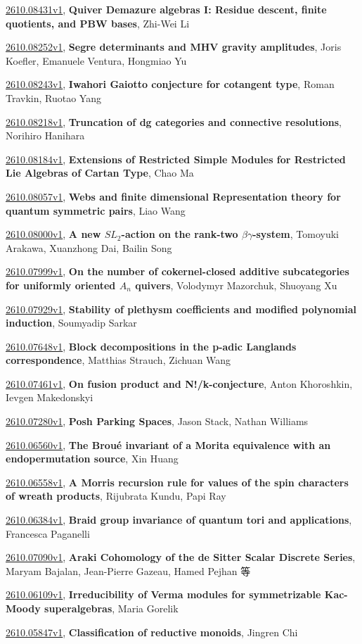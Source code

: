 \documentclass[9pt, a4paper]{article}
\theoremstyle{plain}
\theoremstyle{definition}
\theoremstyle{remark}
\newcommand{\arxiv}[3]{\href{https://arxiv.org/abs/#1}{#1}, \textbf{\textcolor{arxivblue}{#2}}, #3}
\begin{document}
\arxiv{2610.08431v1}{Quiver Demazure algebras I: Residue descent, finite quotients, and PBW bases}{Zhi-Wei Li}

\arxiv{2610.08252v1}{Segre determinants and MHV gravity amplitudes}{Joris Koefler, Emanuele Ventura, Hongmiao Yu}

\arxiv{2610.08243v1}{Iwahori Gaiotto conjecture for cotangent type}{Roman Travkin, Ruotao Yang}

\arxiv{2610.08218v1}{Truncation of dg categories and connective resolutions}{Norihiro Hanihara}

\arxiv{2610.08184v1}{Extensions of Restricted Simple Modules for Restricted Lie Algebras of Cartan Type}{Chao Ma}

\arxiv{2610.08057v1}{Webs and finite dimensional Representation theory for quantum symmetric pairs}{Liao Wang}

\arxiv{2610.08000v1}{A new $SL_2$-action on the rank-two $βγ$-system}{Tomoyuki Arakawa, Xuanzhong Dai, Bailin Song}

\arxiv{2610.07999v1}{On the number of cokernel-closed additive subcategories for uniformly oriented $A_n$ quivers}{Volodymyr Mazorchuk, Shuoyang Xu}

\arxiv{2610.07929v1}{Stability of plethysm coefficients and modified polynomial induction}{Soumyadip Sarkar}

\arxiv{2610.07648v1}{Block decompositions in the p-adic Langlands correspondence}{Matthias Strauch, Zichuan Wang}

\arxiv{2610.07461v1}{On fusion product and N!/k-conjecture}{Anton Khoroshkin, Ievgen Makedonskyi}

\arxiv{2610.07280v1}{Posh Parking Spaces}{Jason Stack, Nathan Williams}

\arxiv{2610.06560v1}{The Broué invariant of a Morita equivalence with an endopermutation source}{Xin Huang}

\arxiv{2610.06558v1}{A Morris recursion rule for values of the spin characters of wreath products}{Rijubrata Kundu, Papi Ray}

\arxiv{2610.06384v1}{Braid group invariance of quantum tori and applications}{Francesca Paganelli}

\arxiv{2610.07090v1}{Araki Cohomology of the de Sitter Scalar Discrete Series}{Maryam Bajalan, Jean-Pierre Gazeau, Hamed Pejhan 等}

\arxiv{2610.06109v1}{Irreducibility of Verma modules for symmetrizable Kac-Moody superalgebras}{Maria Gorelik}

\arxiv{2610.05847v1}{Classification of reductive monoids}{Jingren Chi}
\end{document}
